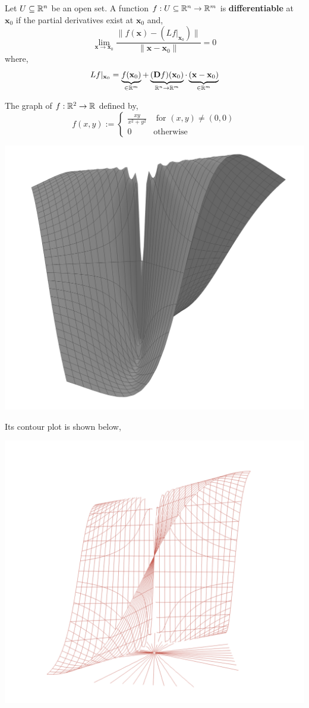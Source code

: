 \begin{defn}
    Let $U \subseteq \mathbb{R}^n$ be an open set. A function $f: U \subseteq \mathbb{R}^n \rightarrow \mathbb{R}^m$ is \textbf{differentiable} at $\mathbf{x}_0$ if the partial derivatives exist at $\mathbf{x}_0$ and,
    \[\lim_{\mathbf{x} \rightarrow \mathbf{x}_0} \frac{\|f(\mathbf{x}) - (L f |_{\mathbf{x}_0})\|}{\|\mathbf{x} - \mathbf{x}_0\|} = 0\]
    where,
    \[L f |_{\mathbf{x}_0} = \underbrace{f(\mathbf{x}_0)}_{\in \mathbb{R}^m} + \underbrace{(\mathbf{D} f)(\mathbf{x}_0)}_{\mathbb{R}^n \rightarrow \mathbb{R}^m} \cdot \underbrace{(\mathbf{x} - \mathbf{x}_0)}_{\in \mathbb{R}^m}\]
\end{defn}

\begin{marginfigure}
    The graph of $f: \mathbb{R}^2 \rightarrow \mathbb{R}$ defined by,
    \[f(x,y) := \begin{cases}
         \frac{xy}{x^2 + y^2} & \text{ for } (x, y) \neq (0,0) \\
         0 & \text{otherwise}
      \end{cases}
    \]
    \begin{center}
        \includegraphics[width=0.6\linewidth]{figures/wk-2/fig-22.png}
    \end{center}
    Its contour plot is shown below,
    \begin{center}
        \includegraphics[width=0.8\linewidth]{figures/wk-2/fig-21.png}
    \end{center}
\end{marginfigure}

